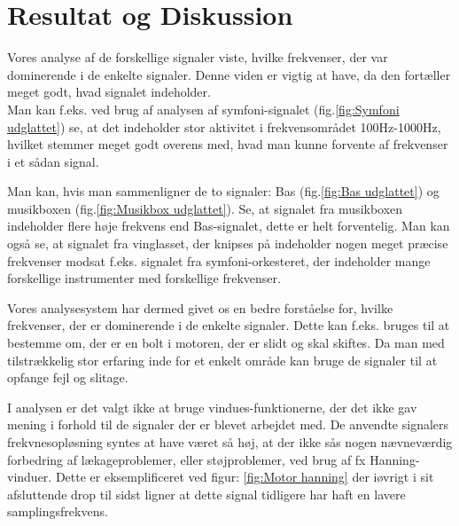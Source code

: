 \chapter{Resultat og Diskussion}\label{ch:Resultat og Diskussion}

Vores analyse af de forskellige signaler viste, hvilke frekvenser, der var dominerende i de enkelte signaler. Denne viden er vigtig at have, da den fortæller meget godt, hvad signalet indeholder. \\Man kan f.eks. ved brug af analysen af symfoni-signalet (fig.\ref{fig:Symfoni udglattet}) se, at det indeholder stor aktivitet i frekvensområdet 100Hz-1000Hz, hvilket stemmer meget godt overens med, hvad man kunne forvente af frekvenser i et sådan signal.

Man kan, hvis man sammenligner de to signaler: Bas (fig.\ref{fig:Bas udglattet}) og musikboxen (fig.\ref{fig:Musikbox udglattet}). Se, at signalet fra musikboxen indeholder flere høje frekvens end Bas-signalet, dette er helt forventelig. Man kan også se, at signalet fra vinglasset, der knipses på indeholder nogen meget præcise frekvenser modsat f.eks. signalet fra symfoni-orkesteret, der indeholder mange forskellige instrumenter med forskellige frekvenser.

Vores analysesystem har dermed givet os en bedre forståelse for, hvilke frekvenser, der er dominerende i de enkelte signaler. Dette kan f.eks. bruges til at bestemme om, der er en bolt i motoren, der er slidt og skal skiftes. Da man med tilstrækkelig stor erfaring inde for et enkelt område kan bruge de signaler til at opfange fejl og slitage.

I analysen er det valgt ikke at bruge vindues-funktionerne, der det ikke gav mening i forhold til de signaler der er blevet arbejdet med. De anvendte signalers frekvnesopløsning syntes at have været så høj, at der ikke sås nogen nævneværdig forbedring af lækageproblemer, eller støjproblemer, ved brug af  fx Hanning-vinduer. Dette er eksemplificeret ved figur: \ref{fig:Motor hanning} der iøvrigt i sit afsluttende drop til sidst ligner at dette signal tidligere har haft en lavere samplingsfrekvens.  
